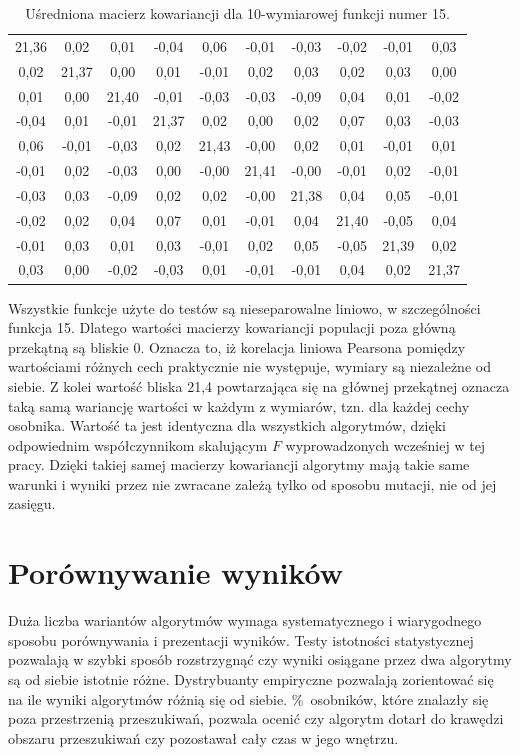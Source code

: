 \documentclass[a4paper,onecolumn,oneside,11pt,wide,floatssmall]{mwrep}
\theoremstyle{definition}
\theoremstyle{plain}%
\theoremstyle{remark}
\begin{document}
\begin{table}[H]
\centering
\begin{tabular}{ c c c c c c c c c c }
21,36 & 0,02 & 0,01 & -0,04 & 0,06 & -0,01 & -0,03 & -0,02 & -0,01 & 0,03 \\
0,02 & 21,37 & 0,00 & 0,01 & -0,01 & 0,02 & 0,03 & 0,02 & 0,03 & 0,00 \\
0,01 & 0,00 & 21,40 & -0,01 & -0,03 & -0,03 & -0,09 & 0,04 & 0,01 & -0,02 \\
-0,04 & 0,01 & -0,01 & 21,37 & 0,02 & 0,00 & 0,02 & 0,07 & 0,03 & -0,03 \\
0,06 & -0,01 & -0,03 & 0,02 & 21,43 & -0,00 & 0,02 & 0,01 & -0,01 & 0,01 \\
-0,01 & 0,02 & -0,03 & 0,00 & -0,00 & 21,41 & -0,00 & -0,01 & 0,02 & -0,01 \\
-0,03 & 0,03 & -0,09 & 0,02 & 0,02 & -0,00 & 21,38 & 0,04 & 0,05 & -0,01 \\
-0,02 & 0,02 & 0,04 & 0,07 & 0,01 & -0,01 & 0,04 & 21,40 & -0,05 & 0,04 \\
-0,01 & 0,03 & 0,01 & 0,03 & -0,01 &  0,02 & 0,05 & -0,05 & 21,39 & 0,02 \\
0,03 & 0,00 & -0,02 & -0,03 & 0,01 & -0,01 & -0,01 &  0,04 & 0,02 & 21,37 \\
\end{tabular}
\caption{Uśredniona macierz kowariancji dla 10-wymiarowej funkcji numer 15.}
\label{table:cov_matrix}
\end{table}

Wszystkie funkcje użyte do testów są nieseparowalne liniowo, w szczególności funkcja 15.
Dlatego wartości macierzy kowariancji populacji poza główną przekątną są bliskie 0. Oznacza to,
iż korelacja liniowa Pearsona pomiędzy wartościami różnych cech praktycznie nie występuje, wymiary
są niezależne od siebie. Z kolei wartość bliska 21,4 powtarzająca się na głównej przekątnej 
oznacza taką samą wariancję wartości w każdym z wymiarów, tzn. dla każdej cechy osobnika.
Wartość ta jest identyczna dla wszystkich algorytmów, dzięki odpowiednim współczynnikom skalującym
$F$ wyprowadzonych wcześniej w tej pracy. Dzięki takiej samej macierzy kowariancji algorytmy
mają takie same warunki i wyniki przez nie zwracane zależą tylko od sposobu mutacji, nie od jej
zasięgu.

\section{Porównywanie wyników}

Duża liczba wariantów algorytmów wymaga systematycznego i wiarygodnego sposobu porównywania
i prezentacji wyników. Testy istotności statystycznej pozwalają w szybki sposób rozstrzygnąć czy 
wyniki osiągane przez dwa algorytmy są od siebie istotnie różne. Dystrybuanty empiryczne
pozwalają zorientować się na ile wyniki algorytmów różnią się od siebie. \%~osobników, które
znalazły się poza przestrzenią przeszukiwań, pozwala ocenić czy algorytm dotarł do krawędzi
obszaru przeszukiwań czy pozostawał cały czas w jego wnętrzu.
\end{document}
